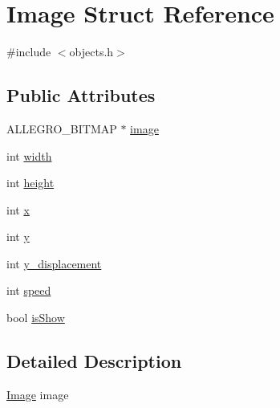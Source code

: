 \hypertarget{struct_image}{\section{Image Struct Reference}
\label{struct_image}
}


{\ttfamily \#include $<$objects.\-h$>$}

\subsection*{Public Attributes}
\begin{DoxyCompactItemize}
\item 
A\-L\-L\-E\-G\-R\-O\-\_\-\-B\-I\-T\-M\-A\-P $\ast$ \hyperlink{struct_image_a48911c76fc670b89a89b3a3d4dc5bd0e}{image}
\item 
int \hyperlink{struct_image_ab8d12f635013c04159cd4d3d972bac88}{width}
\item 
int \hyperlink{struct_image_a51df43db420c9c0b57536cb2dd36de5c}{height}
\item 
int \hyperlink{struct_image_a7f8f4530212c93856e611030e46c82af}{x}
\item 
int \hyperlink{struct_image_a9b03b7d8dd6f69cb5a444bdd0edd786e}{y}
\item 
int \hyperlink{struct_image_aabf0f9008e51f8afa9137459ab410703}{y\-\_\-displacement}
\item 
int \hyperlink{struct_image_aa77f97d93c43c67e11a68028aafa062b}{speed}
\item 
bool \hyperlink{struct_image_a8914532f5c09f3cb38df19e5bea265fd}{is\-Show}
\end{DoxyCompactItemize}


\subsection{Detailed Description}
\hyperlink{struct_image}{Image} image 

